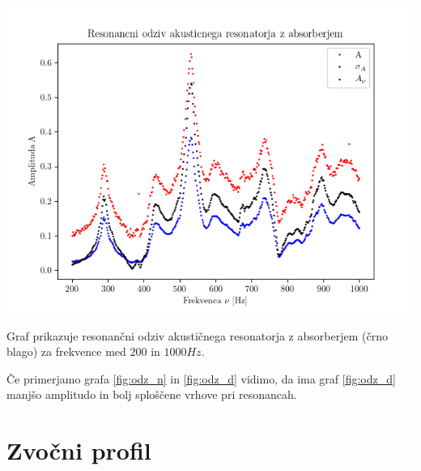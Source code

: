 \documentclass[12pt]{report}
\begin{document}
\begin{slika}[H]
  \centering
  \includegraphics{02Duseno}
  \caption{\small Graf prikazuje resonančni odziv akustičnega resonatorja z absorberjem (črno blago) za frekvence med $200$ in $1000Hz$. }
  \label{fig:odz_d}
\end{slika}

Če primerjamo grafa \ref{fig:odz_n} in \ref{fig:odz_d} vidimo, da ima graf \ref{fig:odz_d} manjšo amplitudo in bolj sploščene vrhove pri resonancah.

\section*{Zvočni profil}
\end{document}

